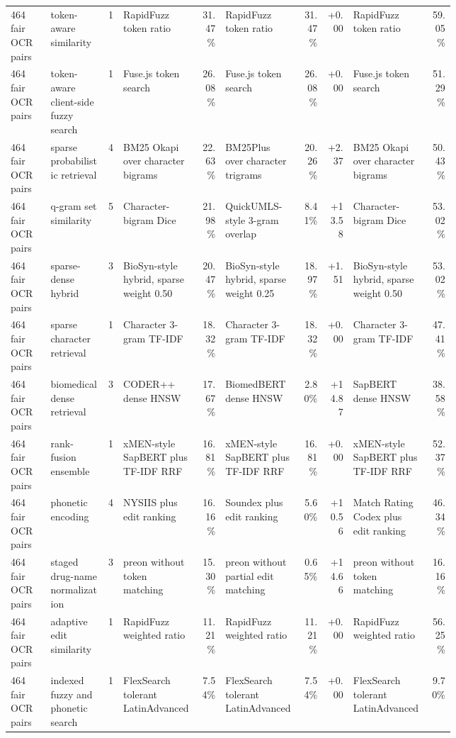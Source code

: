 \begin{landscape}
\begin{tiny}
\begin{longtable}{@{}L{0.09\linewidth}L{0.13\linewidth}rL{0.17\linewidth}rL{0.17\linewidth}rrL{0.17\linewidth}r@{}}
464 fair OCR pairs & token-aware similarity & 1 & RapidFuzz token ratio & 31.47\% & RapidFuzz token ratio & 31.47\% & +0.00 & RapidFuzz token ratio & 59.05\% \\
464 fair OCR pairs & token-aware client-side fuzzy search & 1 & Fuse.js token search & 26.08\% & Fuse.js token search & 26.08\% & +0.00 & Fuse.js token search & 51.29\% \\
464 fair OCR pairs & sparse probabilistic retrieval & 4 & BM25 Okapi over character bigrams & 22.63\% & BM25Plus over character trigrams & 20.26\% & +2.37 & BM25 Okapi over character bigrams & 50.43\% \\
464 fair OCR pairs & q-gram set similarity & 5 & Character-bigram Dice & 21.98\% & QuickUMLS-style 3-gram overlap & 8.41\% & +13.58 & Character-bigram Dice & 53.02\% \\
464 fair OCR pairs & sparse-dense hybrid & 3 & BioSyn-style hybrid, sparse weight 0.50 & 20.47\% & BioSyn-style hybrid, sparse weight 0.25 & 18.97\% & +1.51 & BioSyn-style hybrid, sparse weight 0.50 & 53.02\% \\
464 fair OCR pairs & sparse character retrieval & 1 & Character 3-gram TF-IDF & 18.32\% & Character 3-gram TF-IDF & 18.32\% & +0.00 & Character 3-gram TF-IDF & 47.41\% \\
464 fair OCR pairs & biomedical dense retrieval & 3 & CODER++ dense HNSW & 17.67\% & BiomedBERT dense HNSW & 2.80\% & +14.87 & SapBERT dense HNSW & 38.58\% \\
464 fair OCR pairs & rank-fusion ensemble & 1 & xMEN-style SapBERT plus TF-IDF RRF & 16.81\% & xMEN-style SapBERT plus TF-IDF RRF & 16.81\% & +0.00 & xMEN-style SapBERT plus TF-IDF RRF & 52.37\% \\
464 fair OCR pairs & phonetic encoding & 4 & NYSIIS plus edit ranking & 16.16\% & Soundex plus edit ranking & 5.60\% & +10.56 & Match Rating Codex plus edit ranking & 46.34\% \\
464 fair OCR pairs & staged drug-name normalization & 3 & preon without token matching & 15.30\% & preon without partial edit matching & 0.65\% & +14.66 & preon without token matching & 16.16\% \\
464 fair OCR pairs & adaptive edit similarity & 1 & RapidFuzz weighted ratio & 11.21\% & RapidFuzz weighted ratio & 11.21\% & +0.00 & RapidFuzz weighted ratio & 56.25\% \\
464 fair OCR pairs & indexed fuzzy and phonetic search & 1 & FlexSearch tolerant LatinAdvanced & 7.54\% & FlexSearch tolerant LatinAdvanced & 7.54\% & +0.00 & FlexSearch tolerant LatinAdvanced & 9.70\% \\

\end{longtable}
\end{tiny}
\end{landscape}
